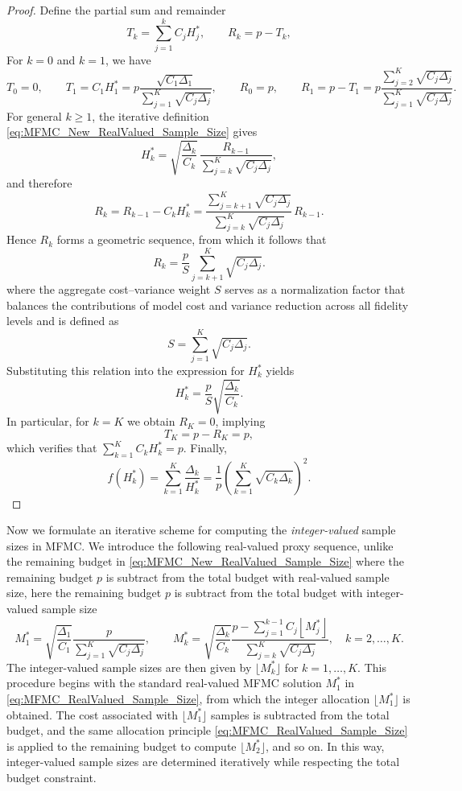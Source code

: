\begin{proof}
Define the partial sum and remainder
\[
    T_k = \sum_{j=1}^k C_j H_j^*, 
    \qquad 
    R_k = p - T_k,
\]
For $k=0$ and $k=1$, we have
\[
    T_0 = 0, 
    \qquad 
    T_1 = C_1H_1^* 
    = p\frac{\sqrt{C_1\Delta_1}}{\sum_{j=1}^K \sqrt{C_j\Delta_j}},
    \qquad
    R_0 = p,
    \qquad
    R_1 = p-T_1
    = p\frac{\sum_{j=2}^K \sqrt{C_j\Delta_j}}{\sum_{j=1}^K \sqrt{C_j\Delta_j}}.
\]
For general $k\ge 1$, the iterative definition \eqref{eq:MFMC_New_RealValued_Sample_Size} gives
\[
    H_k^*
    = \sqrt{\frac{\Delta_k}{C_k}}\,
      \frac{R_{k-1}}{\sum_{j=k}^K \sqrt{C_j \Delta_j}},
\]
%
and therefore
%
\[
    R_k 
    = R_{k-1} - C_k H_k^*
    = \frac{\sum_{j=k+1}^K \sqrt{C_j \Delta_j}}
           {\sum_{j=k}^K \sqrt{C_j \Delta_j}} \, R_{k-1}.
\]
%
Hence $R_k$ forms a geometric sequence, from which it follows that
%
\[
R_k=\frac{p}{S}\sum_{j=k+1}^K\sqrt{C_j\Delta_j}.
\]
%
where the aggregate cost–variance weight $S$ serves as a normalization factor that balances the contributions of model cost and variance reduction across all fidelity levels and is defined as
%
\begin{equation}\label{eq:aggregate_cost–variance_weight_S}
    S = \sum_{j=1}^K \sqrt{C_j \Delta_j}.
\end{equation}
%
Substituting this relation into the expression for $H_k^*$ yields
%
\[
    H_k^*
    = \frac{p}{S}\sqrt{\frac{\Delta_k}{C_k}}.
\]
In particular, for $k = K$ we obtain $R_K = 0$, implying
\[
    T_K = p - R_K = p,
\]
which verifies that $\sum_{k=1}^K C_k H_k^* = p$. Finally,
\[
    f(H_k^*)
    = \sum_{k=1}^K \frac{\Delta_k}{H_k^*}
    = \frac{1}{p} \left(\sum_{k=1}^K \sqrt{C_k\Delta_k}\right)^2.
\]
\end{proof}
%

Now we formulate an iterative scheme for computing the \textit{integer-valued} sample sizes in MFMC. We introduce the following real-valued proxy sequence, unlike the remaining budget in \eqref{eq:MFMC_New_RealValued_Sample_Size} where the remaining budget $p$ is subtract from the total budget with real-valued sample size, here the remaining budget $p$ is subtract from the total budget with integer-valued sample size
%
\begin{equation}
    \label{eq:MFMC_New_IntegerValued_Sample_Size}
    M_1^* = \sqrt{\frac{\Delta_1}{C_1}}\frac{p}{\sum_{j=1}^K\sqrt{C_j\Delta_j}}, 
    \qquad 
    M_k^* = \sqrt{\frac{\Delta_k}{C_k}}\frac{p-\sum_{j=1}^{k-1}C_j\left\lfloor M_j^* \right\rfloor}{\sum_{j=k}^K\sqrt{C_j\Delta_j}}, 
    \quad k = 2,\ldots, K.
\end{equation}
%
The integer-valued sample sizes are then given by $\lfloor M_k^* \rfloor$ for $k = 1,\ldots, K$.  
This procedure begins with the standard real-valued MFMC solution $M_1^*$ in \eqref{eq:MFMC_RealValued_Sample_Size}, from which the integer allocation $\lfloor M_1^* \rfloor$ is obtained.  
The cost associated with $\lfloor M_1^* \rfloor$ samples is subtracted from the total budget, and the same allocation principle \eqref{eq:MFMC_RealValued_Sample_Size} is applied to the remaining budget to compute $\lfloor M_2^* \rfloor$, and so on.  
In this way, integer-valued sample sizes are determined iteratively while respecting the total budget constraint.

